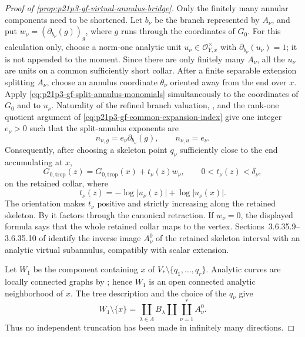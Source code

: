 \begin{proof}[Proof of
\cref{prop:p21p3-gf-virtual-annulus-bridge}]
Only the finitely many annular components need to be shortened.  Let
\(b_\nu\) be the branch represented by \(A_\nu\), and put
\(w_\nu=(\partial_{b_\nu}(g))_g\), where \(g\) runs through the coordinates
of \(G_0\).  For this calculation only, choose a norm-one analytic unit
\(u_\nu\in\mathcal O_{Y,x}^{\times}\) with
\(\partial_{b_\nu}(u_\nu)=1\); it is not appended to the moment.  Since there
are only finitely many \(A_\nu\), all the \(u_\nu\) are units on a common
sufficiently short collar.  After a finite separable extension splitting
\(A_\nu\), choose an annulus coordinate \(\theta_\nu\) oriented away from the
end over \(x\).  Apply \eqref{eq:p21p3-gf-split-annulus-monomials}
simultaneously to the coordinates of \(G_0\) and to \(u_\nu\).  Naturality of
the refined branch valuation, \cite[\S4.2.9]{Ducros24CurveStructure}, and the
rank-one quotient argument of
\eqref{eq:p21p3-gf-common-expansion-index} give one integer \(e_\nu>0\) such
that the split-annulus exponents are
\[
 n_{\nu,g}=e_\nu\partial_{b_\nu}(g),
 \qquad n_{\nu,u}=e_\nu.
\]
Consequently, after choosing a skeleton point \(q_\nu\) sufficiently close to
the end accumulating at \(x\),
\begin{equation}
 G_{0,\mathrm{trop}}(z)
   =G_{0,\mathrm{trop}}(x)+t_\nu(z)w_\nu,
 \qquad 0<t_\nu(z)<\delta_\nu,
 \label{eq:p21p3-gf-finite-annulus-ray-formula}
\end{equation}
on the retained collar, where
\[
 t_\nu(z)=-\log|u_\nu(z)|+\log|u_\nu(x)|.
\]
The orientation makes \(t_\nu\) positive and strictly increasing along the
retained skeleton.  By \cite[\S3.6.35.8]{Ducros24CurveStructure} it factors
through the canonical retraction.  If \(w_\nu=0\), the displayed formula says
that the whole retained collar maps to the vertex.
Sections~3.6.35.9--3.6.35.10 of \cite{Ducros24CurveStructure} identify the
inverse image \(A_\nu^0\) of the retained skeleton interval with an analytic
virtual subannulus, compatibly with scalar extension.

Let \(W_1\) be the component containing \(x\) of
\(V_*\setminus\{q_1,\ldots,q_r\}\).  Analytic curves are locally connected
graphs by \cite[Theorem~3.5.1]{Ducros24CurveStructure}; hence \(W_1\) is an
open connected analytic neighborhood of \(x\).  The tree description and
the choice of the \(q_\nu\) give
\begin{equation}
 W_1\setminus\{x\}
   =\coprod_{\lambda\in\Lambda}B_\lambda
      \amalg\coprod_{\nu=1}^{r}A_\nu^0.
 \label{eq:p21p3-gf-trimmed-star-decomposition}
\end{equation}
Thus no independent truncation has been made in infinitely many directions.


\end{proof}
